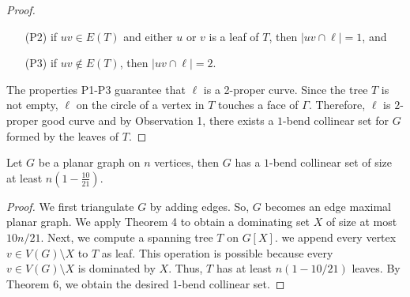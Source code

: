 \begin{proof}
\begin{enumerate}
        \item [(P2)] if $uv \in E(T)$ and either $u$ or $v$ is a leaf of $T$, then $|uv \cap \ell| = 1$, and

        \item [(P3)] if $uv \notin E(T)$, then $|uv \cap \ell| = 2$.
    \end{enumerate}

    The properties P1-P3 guarantee that $\ell$ is a 2-proper curve. Since the tree $T$ is not empty, $\ell$ on the circle of a vertex in $T$ touches a face of $\Gamma$. Therefore, $\ell$ is $2$-proper good curve and by Observation 1, there exists a $1$-bend collinear set for $G$ formed by the leaves of $T$.


\end{proof}


\begin{thm}
    Let $G$ be a planar graph on $n$ vertices, then $G$ has a $1$-bend collinear set of size at least $n(1 - \frac{10}{21})$.
\end{thm}

\begin{proof}
We first triangulate $G$ by adding edges. So, $G$ becomes an edge maximal planar graph. We apply Theorem 4 to obtain a dominating set $X$ of size at most $10n/21$. Next, we compute a spanning tree $T$ on $G[X]$. we append every vertex $v \in V(G)\setminus X$ to $T$ as leaf. This operation is possible because every $v \in V(G) \setminus X$ is dominated by $X$. Thus, $T$ has at least $n(1 - 10/21)$ leaves. By Theorem 6, we obtain the desired 1-bend collinear set.
\end{proof}